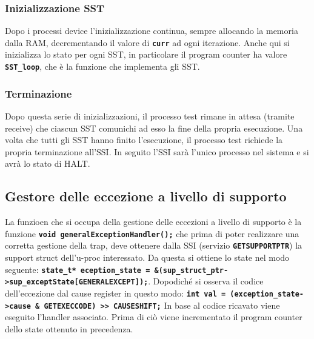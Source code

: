 \documentclass{article}
\begin{document}
	\subsubsection{Inizializzazione SST}
	Dopo i processi device l'inizializzazione continua, sempre allocando la memoria
	dalla RAM, decrementando il valore di \texttt{\textbf{curr}} ad ogni iterazione.
	Anche qui si inizializza lo stato per ogni SST, in particolare il program counter
	ha valore \texttt{\textbf{SST\_loop}}, che è la funzione che implementa gli SST.

	\subsubsection{Terminazione}
	Dopo questa serie di inizializzazioni, il processo test rimane in attesa (tramite
	receive) che ciascun SST comunichi ad esso la fine della propria esecuzione. Una
	volta che tutti gli SST hanno finito l'esecuzione, il processo test richiede
	la propria terminazione all'SSI. In seguito l'SSI sarà l'unico processo nel sistema
	e si avrà lo stato di HALT.

	\newpage
	\subsection{Gestore delle eccezione a livello di supporto}
	La funzioen che si occupa della gestione delle eccezioni a livello di supporto
	è la funzione \texttt{\textbf{void generalExceptionHandler();}} che prima di
	poter realizzare una corretta gestione della trap, deve ottenere dalla SSI (servizio
	\texttt{\textbf{GETSUPPORTPTR}}) la support struct dell'u-proc interessato. Da
	questa si ottiene lo state nel modo seguente:
	\newline
	\texttt{\textbf{state\_t* eception\_state = \&(sup\_struct\_ptr->sup\_exceptState[GENERALEXCEPT]);}}.
	Dopodiché si osserva il codice dell'eccezione dal cause register in questo
	modo:
	\newline
	\texttt{\textbf{int val = (exception\_state->cause \& GETEXECCODE) >>
	CAUSESHIFT;}}
	\newline
	In base al codice ricavato viene eseguito l'handler associato. Prima di ciò viene
	incrementato il program counter dello state ottenuto in precedenza.
\end{document}
